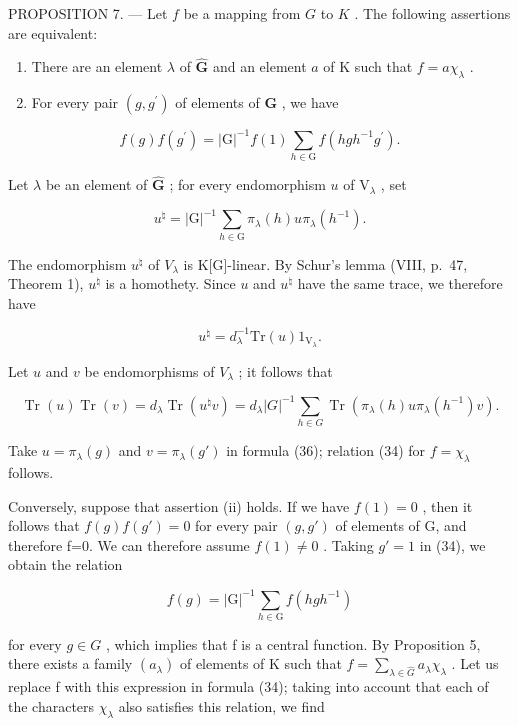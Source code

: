 PROPOSITION 7. --- Let \(f\) be a mapping from \(G\) to \(K\) . The following assertions are equivalent:

\begin{enumerate}
\def\labelenumi{(\roman{enumi})}
\item
  There are an element \(\lambda\) of \(\widehat{\mathbf{G}}\) and an element \(a\) of \(\mathrm{K}\) such that \(f = a\chi_{\lambda}\) .
\item
  For every pair \((g,g^{\prime})\) of elements of \(\mathbf{G}\) , we have
\end{enumerate}

\[
f (g) f (g ^ {\prime}) = | \mathrm{G} | ^ {- 1} f (1) \sum_ {h \in \mathrm{G}} f (h g h ^ {- 1} g ^ {\prime}).\tag{34}
\]

Let \(\lambda\) be an element of \(\widehat{\mathbf{G}}\) ; for every endomorphism \(u\) of \(\mathrm{V}_{\lambda}\) , set

\[
u ^ {\natural} = | \mathrm{G} | ^ {- 1} \sum_ {h \in \mathrm{G}} \pi_ {\lambda} (h) u \pi_ {\lambda} (h ^ {- 1}).\tag{35}
\]

The endomorphism \(u^{\natural}\) of \(V_{\lambda}\) is K{[}G{]}-linear. By Schur's lemma (VIII, p.~47, Theorem 1), \(u^{\natural}\) is a homothety. Since \(u\) and \(u^{\natural}\) have the same trace, we therefore have

\[
u ^ {\natural} = d _ {\lambda} ^ {- 1} \mathrm{Tr} (u) 1 _ {\mathrm{V} _ {\lambda}}.
\]

Let \(u\) and \(v\) be endomorphisms of \(V_{\lambda}\) ; it follows that

\[
\operatorname{Tr} (u) \operatorname{Tr} (v) = d _ {\lambda} \operatorname{Tr} (u ^ {\natural} v) = d _ {\lambda} | G | ^ {- 1} \sum_ {h \in G} \operatorname{Tr} (\pi_ {\lambda} (h) u \pi_ {\lambda} (h ^ {- 1}) v).\tag{36}
\]

Take \(u = \pi_{\lambda}(g)\) and \(v = \pi_{\lambda}(g')\) in formula (36); relation (34) for \(f = \chi_{\lambda}\) follows.

Conversely, suppose that assertion (ii) holds. If we have \(f(1)=0\) , then it follows that \(f(g)f(g')=0\) for every pair \((g,g')\) of elements of G, and therefore f=0. We can therefore assume \(f(1)\neq0\) . Taking \(g'=1\) in (34), we obtain the relation

\[
f (g) = | \mathrm{G} | ^ {- 1} \sum_ {h \in \mathrm{G}} f (h g h ^ {- 1})
\]

for every \(g \in G\) , which implies that f is a central function. By Proposition 5, there exists a family \((a_{\lambda})\) of elements of K such that \(f = \sum_{\lambda \in \widehat{G}} a_{\lambda} \chi_{\lambda}\) . Let us replace f with this expression in formula (34); taking into account that each of the characters \(\chi_{\lambda}\) also satisfies this relation, we find

